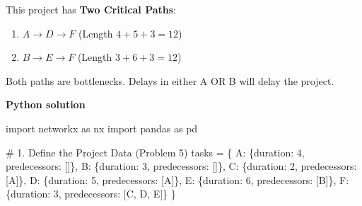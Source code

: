 \documentclass[
  letterpaper,
  DIV=11,
  numbers=noendperiod]{scrreprt}
\newenvironment{Shaded}{\begin{snugshade}}{\end{snugshade}}
\newcommand{\CommentTok}[1]{\textcolor[rgb]{0.37,0.37,0.37}{#1}}
\newcommand{\DecValTok}[1]{\textcolor[rgb]{0.68,0.00,0.00}{#1}}
\newcommand{\ImportTok}[1]{\textcolor[rgb]{0.00,0.46,0.62}{#1}}
\newcommand{\NormalTok}[1]{\textcolor[rgb]{0.00,0.23,0.31}{#1}}
\newcommand{\OperatorTok}[1]{\textcolor[rgb]{0.37,0.37,0.37}{#1}}
\newcommand{\StringTok}[1]{\textcolor[rgb]{0.13,0.47,0.30}{#1}}
\providecommand{\tightlist}{%
  \setlength{\itemsep}{0pt}\setlength{\parskip}{0pt}}
\begin{document}
This project has \textbf{Two Critical Paths}:

\begin{enumerate}
\def\labelenumi{\arabic{enumi}.}
\tightlist
\item
  \(A \to D \to F\) (Length \(4+5+3 = 12\))
\item
  \(B \to E \to F\) (Length \(3+6+3 = 12\))
\end{enumerate}

Both paths are bottlenecks. Delays in either A OR B will delay the
project.

\textbf{Python solution}

\begin{Shaded}
\begin{Highlighting}[]
\ImportTok{import}\NormalTok{ networkx }\ImportTok{as}\NormalTok{ nx}
\ImportTok{import}\NormalTok{ pandas }\ImportTok{as}\NormalTok{ pd}

\CommentTok{\# 1. Define the Project Data (Problem 5)}
\NormalTok{tasks }\OperatorTok{=}\NormalTok{ \{}
    \StringTok{\textquotesingle{}A\textquotesingle{}}\NormalTok{: \{}\StringTok{\textquotesingle{}duration\textquotesingle{}}\NormalTok{: }\DecValTok{4}\NormalTok{, }\StringTok{\textquotesingle{}predecessors\textquotesingle{}}\NormalTok{: []\},}
    \StringTok{\textquotesingle{}B\textquotesingle{}}\NormalTok{: \{}\StringTok{\textquotesingle{}duration\textquotesingle{}}\NormalTok{: }\DecValTok{3}\NormalTok{, }\StringTok{\textquotesingle{}predecessors\textquotesingle{}}\NormalTok{: []\},}
    \StringTok{\textquotesingle{}C\textquotesingle{}}\NormalTok{: \{}\StringTok{\textquotesingle{}duration\textquotesingle{}}\NormalTok{: }\DecValTok{2}\NormalTok{, }\StringTok{\textquotesingle{}predecessors\textquotesingle{}}\NormalTok{: [}\StringTok{\textquotesingle{}A\textquotesingle{}}\NormalTok{]\},}
    \StringTok{\textquotesingle{}D\textquotesingle{}}\NormalTok{: \{}\StringTok{\textquotesingle{}duration\textquotesingle{}}\NormalTok{: }\DecValTok{5}\NormalTok{, }\StringTok{\textquotesingle{}predecessors\textquotesingle{}}\NormalTok{: [}\StringTok{\textquotesingle{}A\textquotesingle{}}\NormalTok{]\},}
    \StringTok{\textquotesingle{}E\textquotesingle{}}\NormalTok{: \{}\StringTok{\textquotesingle{}duration\textquotesingle{}}\NormalTok{: }\DecValTok{6}\NormalTok{, }\StringTok{\textquotesingle{}predecessors\textquotesingle{}}\NormalTok{: [}\StringTok{\textquotesingle{}B\textquotesingle{}}\NormalTok{]\},}
    \StringTok{\textquotesingle{}F\textquotesingle{}}\NormalTok{: \{}\StringTok{\textquotesingle{}duration\textquotesingle{}}\NormalTok{: }\DecValTok{3}\NormalTok{, }\StringTok{\textquotesingle{}predecessors\textquotesingle{}}\NormalTok{: [}\StringTok{\textquotesingle{}C\textquotesingle{}}\NormalTok{, }\StringTok{\textquotesingle{}D\textquotesingle{}}\NormalTok{, }\StringTok{\textquotesingle{}E\textquotesingle{}}\NormalTok{]\}}
\NormalTok{\}}


\end{Highlighting}
\end{Shaded}
\end{document}
